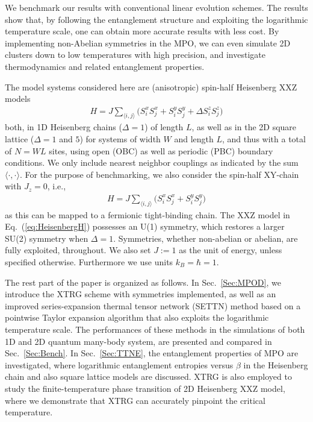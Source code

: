 \documentclass[aps,prx,twocolumn,showpacs,psfig,superscriptaddress,longbibliography]{revtex4-1}
\newcommand{\Sec}[1]{Sec.~\ref{#1}}
\begin{document}
We benchmark our results with conventional linear evolution schemes.
The results show that, by following the entanglement structure and
exploiting the logarithmic temperature scale, one can obtain more
accurate results with less cost. By implementing non-Abelian
symmetries in the MPO, we can even simulate 2D clusters down to low
temperatures with high precision, and investigate thermodynamics and
related entanglement properties.

The model systems considered here are (anisotropic)
spin-half Heisenberg XXZ models 
\begin{eqnarray}
   H=J \sum_{\langle i,j \rangle} \bigl(S_i^x S_j^x  + S_i^y S_j^y + \Delta S_i^z S_j^z\bigr)
\label{eq:HeisenbergH}
\end{eqnarray}
both, in 1D Heisenberg chains ($\Delta=1$) of length $L$, as
well as in the 2D square lattice ($\Delta=1$ and $5$) for
systems of width $W$ and length $L$, and thus with a total of $N=W
L$ sites, using open (OBC) as well as periodic (PBC) boundary conditions.
We only include nearest
neighbor couplings as indicated by the sum $\langle \cdot,\cdot
\rangle$. 
%
For the purpose of benchmarking, we also consider
the spin-half XY-chain with $J_z=0$, i.e.,
\begin{eqnarray}
   H=J \sum_{\langle i,j \rangle}
   \bigl( S_i^x S_{j}^x + S_i^y S_{j}^y \bigr)
\label{eq:HeisenbergXY}
\end{eqnarray}
as this can be mapped to a fermionic tight-binding chain.
The XXZ model in Eq.~(\ref{eq:HeisenbergH}) possesses an U(1)
symmetry, which restores a larger SU(2) symmetry when $\Delta=1$.
Symmetries, whether non-abelian or abelian, are fully exploited,
throughout.
%
We also set $J:=1$ as the unit of energy, unless specified
otherwise. Furthermore we use units $k_B=\hbar=1$.

The rest part of the paper is organized as follows. In
\Sec{Sec:MPOD}, we introduce the XTRG scheme with symmetries
implemented, as well as an improved series-expansion thermal tensor
network (SETTN) method \cite{Chen.b+:2017:SETTN}  {based on a 
pointwise Taylor expansion algorithm that also exploits the logarithmic 
temperature scale}. 
The performances of these methods in the simulations of both
1D and 2D quantum many-body system, are presented and compared in
\Sec{Sec:Bench}.  In \Sec{Sec:TTNE}, the entanglement properties of
MPO are investigated, where logarithmic entanglement entropies
versus $\beta$ in the Heisenberg chain and also square lattice
models are discussed. XTRG is also employed to study the
finite-temperature phase transition of 2D Heisenberg XXZ model,
where we demonstrate that XTRG can accurately pinpoint the critical
temperature.
 
\end{document}
